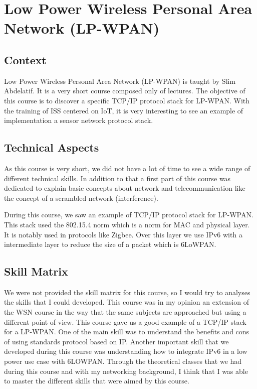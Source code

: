 \section{Low Power Wireless Personal Area Network  (LP-WPAN)}

\subsection{Context}

Low Power Wireless Personal Area Network (LP-WPAN) is taught by Slim Abdelatif. It is a very short course composed only of lectures. The objective of this course is to discover a specific TCP/IP protocol stack for LP-WPAN. With the training of ISS centered on IoT, it is very interesting to see an example of implementation a sensor network protocol stack.

\subsection{Technical Aspects}

As this course is very short, we did not have a lot of time to see a wide range of different technical skills. In addition to that a first part of this course was dedicated to explain basic concepts about network and telecommunication like the concept of a scrambled network (interference). 
\\\par
During this course, we saw an example of TCP/IP protocol stack for LP-WPAN. This stack used the 802.15.4 norm which is a norm for MAC and physical layer. It is notably used in protocols like Zigbee. Over this layer we use IPv6 with a intermediate layer to reduce the size of a packet which is 6LoWPAN.

\subsection{Skill Matrix}

We were not provided the skill matrix for this course, so I would try to analyses the skills that I could developed. This course was in my opinion an extension of the WSN course in the way that the same subjects are approached but using a different point of view. This course gave us a good example of a TCP/IP stack  for a LP-WPAN. One of the main skill was to understand the benefits and cons of using standards protocol based on IP. Another important skill that we developed during this course was understanding how to integrate IPv6 in a low power use case with 6LOWPAN.
Through the theoretical classes that we had during this course and with my networking background, I think that I was able to master the different skills that were aimed by this course.

